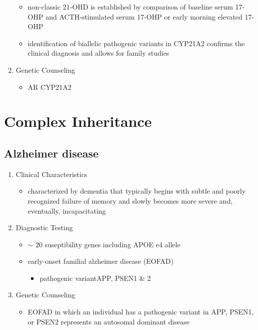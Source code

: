 \documentclass[12pt]{scrartcl}
\begin{document}
\begin{enumerate}
\begin{itemize}
\item non-classic 21-OHD is established by comparison of baseline serum
17-OHP and ACTH-stimulated serum 17-OHP or early morning elevated
17-OHP
\item identification of biallelic pathogenic variants in CYP21A2 confirms
the clinical diagnosis and allows for family studies
\end{itemize}
\item Genetic Counseling
\label{sec:org5224816}
\begin{itemize}
\item AR CYP21A2
\end{itemize}
\end{enumerate}

\section{Complex Inheritance}
\label{sec:orgba07f12}
\subsection{Alzheimer disease}
\label{sec:org3da6c6e}
\begin{enumerate}
\item Clinical Characteristics
\label{sec:orgf819cd3}
\begin{itemize}
\item characterized by dementia that typically begins with subtle and
poorly recognized failure of memory and slowly becomes more severe
and, eventually, incapacitating
\end{itemize}
\item Diagnostic Testing
\label{sec:org256d040}
\begin{itemize}
\item \(\sim\) 20 suseptibility genes including APOE e4 allele
\item early-onset familial alzheimer disease (EOFAD)
\begin{itemize}
\item pathogenic variantAPP, PSEN1 \& 2
\end{itemize}
\end{itemize}
\item Genetic Counseling
\label{sec:org30f68d4}
\begin{itemize}
\item EOFAD in which an individual has a pathogenic variant in APP, PSEN1,
or PSEN2 represents an autosomal dominant disease
\end{itemize}
\end{enumerate}
\end{document}
